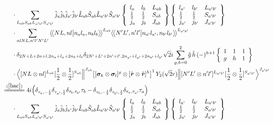 \documentclass[master]{shnuthesis}
\newcommand{\llangle}{\big\langle\!\big\langle}
\newcommand{\rrangle}{\big\rangle\!\big\rangle}
\newcommand{\bmr}{\textbf{\textit{r}}}
\newcommand{\ap}{a^\prime}
\newcommand{\bp}{b^\prime}
\newcommand{\il}{\!\!\!\!\!\!\!\!\!\!}
\newcommand{\zdydh}{\xlongequal}
\begin{document}
\begin{align}
    & \cdot \sum_{L_{ab}S_{ab}L_{\ap\bp}S_{\ap\bp}} \hat{j}_a\hat{j}_b\hat{j}_{\ap}\hat{j}_{\bp}\hat{L}_{ab}\hat{S}_{ab}\hat{L}_{\ap\bp}\hat{S}_{\ap\bp}  \left\{\begin{array}{lll}l_{a} & l_{b} & L_{ab} \\ \frac{1}{2} & \frac{1}{2} & S_{ab} \\j_{a} & j_{b} & J_{ab} \end{array}\right\} \left\{\begin{array}{lll}l_{\ap} & l_{\bp} & L_{\ap\bp} \\ \frac{1}{2} & \frac{1}{2} & S_{\ap\bp} \\j_{\ap} & j_{\bp} & J_{\ap\bp} \end{array}\right\}  \notag \\
    & \cdot \sum_{nlNL,n^\prime l^\prime N^\prime L^\prime} \llangle N L, n l \big| n_{a} l_{a}, n_{b} l_{b} \rrangle^{L_{ab}} \llangle N^\prime L^\prime, n^\prime l^\prime \big| n_{a^\prime} l_{a^\prime}, n_{b^\prime} l_{b^\prime} \rrangle^{L_{\ap\bp}} \notag\\
    & \cdot \delta_{2N+L+2n+l,2n_a+l_a+2n_b+l_b}\delta_{2N^\prime+L^\prime+2n^\prime+l^\prime,2n_{a^\prime}+l_{a^\prime}+2n_{b^\prime}+l_{b^\prime}} \sqrt{2}i \sum_{g,h=0}^2 \hat{g}\,\hat{h}\, (-)^{h+1}  \left\{\begin{array}{ccc} 1 & 1 & 1 \\ g & h & 1 \end{array}\right\}   \notag\\
    & \cdot \Big\langle [N L \otimes n l]^{L_{ab}} [\frac{1}{2}\otimes\frac{1}{2}]^{S_{ab}} \Big\|^{J_{ab}} \big[[\bm{\sigma}_k \otimes \bm{\sigma}_l]^g \otimes [\hat{\bmr} \otimes \hat{\bmr}]^h\big]^1\, Y_2(\sqrt{2}r) \Big\| [N^\prime L^\prime \otimes n^\prime l^\prime]^{L_{\ap\bp}} [\frac{1}{2}\otimes\frac{1}{2}]^{S_{\ap\bp}} \Big\rangle^{J_{\ap \bp}} \\
    &\il \zdydh{(\ref{bac})} 4i \Big( \delta_{\tau_a,-\frac{1}{2}}\delta_{\tau_{\ap},\frac{1}{2}}\delta_{\tau_b,\tau_{\bp}}\tau_b - \delta_{\tau_b,-\frac{1}{2}}\delta_{\tau_{\bp},\frac{1}{2}}\delta_{\tau_a,\tau_{\ap}}\tau_a \Big) \notag\\
    & \cdot \sum_{L_{ab}S_{ab}L_{\ap\bp}S_{\ap\bp}} \hat{j}_a\hat{j}_b\hat{j}_{\ap}\hat{j}_{\bp}\hat{L}_{ab}\hat{S}_{ab}\hat{L}_{\ap\bp}\hat{S}_{\ap\bp}  \left\{\begin{array}{lll}l_{a} & l_{b} & L_{ab} \\ \frac{1}{2} & \frac{1}{2} & S_{ab} \\j_{a} & j_{b} & J_{ab} \end{array}\right\} \left\{\begin{array}{lll}l_{\ap} & l_{\bp} & L_{\ap\bp} \\ \frac{1}{2} & \frac{1}{2} & S_{\ap\bp} \\j_{\ap} & j_{\bp} & J_{\ap\bp} \end{array}\right\}  \notag \\

\end{align}
\end{document}

